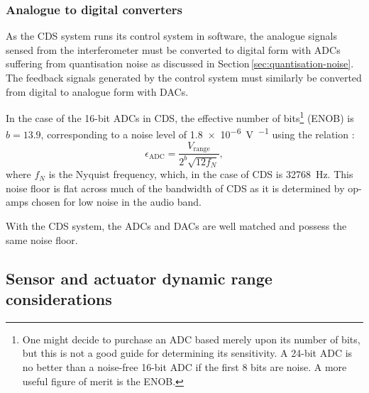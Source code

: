 \subsubsection{\label{sec:adcs-and-dacs}Analogue to digital converters}
As the \gls{CDS} system runs its control system in software, the analogue signals sensed from the interferometer must be converted to digital form with \glspl{ADC} suffering from quantisation noise as discussed in Section\,\ref{sec:quantisation-noise}. The feedback signals generated by the control system must similarly be converted from digital to analogue form with \glspl{DAC}.

In the case of the \num{16}-bit \glspl{ADC} in \gls{CDS}, the effective number of bits\footnote{One might decide to purchase an \gls{ADC} based merely upon its number of bits, but this is not a good guide for determining its sensitivity. A 24-bit \gls{ADC} is no better than a noise-free 16-bit \gls{ADC} if the first 8 bits are noise. A more useful figure of merit is the \gls{ENOB}.} (\gls{ENOB}) is $b = 13.9$, corresponding to a noise level of \SI{1.8e-6}{\volt\per\sqrthz} using the relation \cite{Allen1997}:
\begin{equation}
  \epsilon_{\text{ADC}} = \frac{V_{\text{range}}}{2^b \sqrt{12 f_{N}}},
\end{equation}
where $f_{N}$ is the Nyquist frequency, which, in the case of \gls{CDS} is \SI{32768}{\hertz}. This noise floor is flat across much of the bandwidth of \gls{CDS} as it is determined by op-amps chosen for low noise in the audio band.

With the \gls{CDS} system, the \glspl{ADC} and \glspl{DAC} are well matched and possess the same noise floor.

\subsection{\label{sec:sensors-and-actuators}Sensor and actuator dynamic range considerations}

